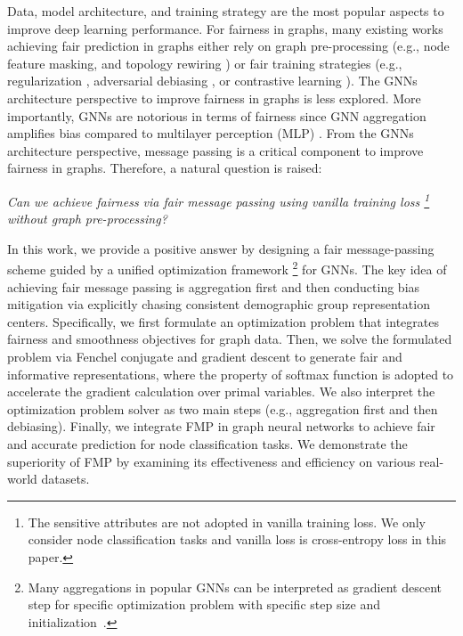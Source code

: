 \documentclass[letterpaper]{article} %
\theoremstyle{plain}
\theoremstyle{definition}
\theoremstyle{remark}
\begin{document}
Data, model architecture, and training strategy are the most popular aspects to improve deep learning performance. For fairness in graphs,
many existing works achieving fair prediction in graphs either rely on graph pre-processing (e.g., node feature masking\citep{kose2021fairness}, and topology rewiring \citep{dong2022edits}) or fair training strategies (e.g., regularization \citep{jiang2022generalized}, adversarial debiasing \citep{dai2021say}, or contrastive learning \citep{Zhu:2020vf,zhu2021graph,agarwal2021towards,ling2023learning}). The GNNs architecture perspective to improve fairness in graphs is less explored. More importantly, GNNs are notorious in terms of fairness since GNN aggregation amplifies bias compared to multilayer perception (MLP) \citep{dai2021say}. From the GNNs architecture perspective, message passing is a critical component to improve fairness in graphs.
Therefore, a natural question is raised: 
\begin{center}
    \textit{Can we achieve fairness via fair message passing using vanilla training loss \footnote{The sensitive attributes are not adopted in vanilla training loss. We only consider node classification tasks and vanilla loss is cross-entropy loss in this paper.} without graph pre-processing?}
\end{center}

In this work, we provide a positive answer by designing a fair message-passing scheme guided by a unified optimization framework \footnote{Many aggregations in popular GNNs can be interpreted as gradient descent step for specific optimization problem with specific step size and initialization~\citep{ma2021unified,zhu2021graph}.} for GNNs. The key idea of achieving fair message passing is aggregation first and then conducting bias mitigation via explicitly chasing consistent demographic group representation centers. Specifically,
we first formulate an optimization problem that integrates fairness and smoothness objectives for graph data. Then, we solve the formulated problem via Fenchel conjugate and gradient descent to generate fair and informative representations, where the property of softmax function is adopted to accelerate the gradient calculation over primal variables. We also interpret the optimization problem solver as two main steps (e.g., aggregation first and then debiasing). Finally, we integrate FMP in graph neural networks to achieve fair and accurate prediction for node classification tasks. We demonstrate the superiority of FMP by examining its effectiveness and efficiency on various real-world datasets.
\end{document}
